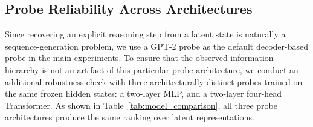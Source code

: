 \subsection{Probe Reliability Across Architectures}
Since recovering an explicit reasoning step from a latent state is naturally a sequence-generation problem, we use a GPT-2 probe as the default decoder-based probe in the main experiments.
To ensure that the observed information hierarchy is not an artifact of this particular probe architecture, we conduct an additional robustness check with three architecturally distinct probes trained on the same frozen hidden states: a two-layer MLP, and a two-layer four-head Transformer. As shown in Table~\ref{tab:model_comparison}, all three probe architectures produce the same ranking over latent representations.



